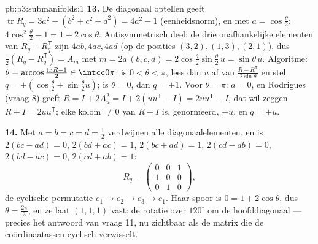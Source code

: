 \begin{solution}{pb:b3:submanifolds:1}
\textbf{13.} De diagonaal optellen geeft $\operatorname{tr}R_q =
3a^2 - (b^2 + c^2 + d^2) = 4a^2 - 1$ (eenheidsnorm), en met $a =
\cos\frac\theta2$: $4\cos^2\frac\theta2 - 1 = 1 + 2\cos\theta$.
Antisymmetrisch deel: de drie onafhankelijke elementen van $R_q -
R_q^{\mathsf T}$ zijn $4ab, 4ac, 4ad$ (op de posities $(3,2),
(1,3), (2,1)$), dus $\frac12(R_q - R_q^{\mathsf T}) = A_m$ met $m
= 2a\,(b, c, d) = 2\cos\frac\theta2\sin\frac\theta2\,u =
\sin\theta\,u$. Algoritme: $\theta = \arccos
\frac{\operatorname{tr}R - 1}{2} \in \intcc0\pi$; is $0 < \theta
< \pi$, lees dan $u$ af van $\frac{R - R^{\mathsf
T}}{2\sin\theta}$ en stel $q = \pm(\cos\frac\theta2 +
\sin\frac\theta2 u)$; is $\theta = 0$, dan $q = \pm1$. Voor
$\theta = \pi$: $a = 0$, en Rodrigues (vraag 8) geeft $R = I +
2A_u^2 = I + 2(uu^{\mathsf T} - I) = 2uu^{\mathsf T} - I$, dat
wil zeggen $R + I = 2uu^{\mathsf T}$; elke kolom $\neq 0$ van $R
+ I$ is, genormeerd, $\pm u$, en $q = \pm u$.

\textbf{14.} Met $a = b = c = d = \frac12$ verdwijnen alle
diagonaalelementen, en is $2(bc - ad) = 0$, $2(bd + ac) = 1$,
$2(bc + ad) = 1$, $2(cd - ab) = 0$, $2(bd - ac) = 0$, $2(cd + ab)
= 1$:
\[
R_q = \begin{pmatrix} 0 & 0 & 1\\ 1 & 0 & 0\\ 0 & 1 & 0
\end{pmatrix},
\]
de cyclische permutatie $e_1 \to e_2 \to e_3 \to e_1$. Haar spoor
is $0 = 1 + 2\cos\theta$, dus $\theta = \frac{2\pi}3$, en ze laat
$(1,1,1)$ vast: de rotatie over $120^\circ$ om de hoofddiagonaal
--- precies het antwoord van vraag 11, nu zichtbaar als de matrix
die de coördinaatassen cyclisch verwisselt.


\end{solution}
